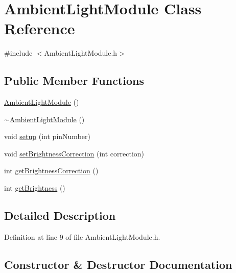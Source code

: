 \hypertarget{class_ambient_light_module}{}\section{Ambient\+Light\+Module Class Reference}
\label{class_ambient_light_module}


{\ttfamily \#include $<$Ambient\+Light\+Module.\+h$>$}

\subsection*{Public Member Functions}
\begin{DoxyCompactItemize}
\item 
\mbox{\hyperlink{class_ambient_light_module_af809a11bd02237709840e18639108b00}{Ambient\+Light\+Module}} ()
\item 
\mbox{\hyperlink{class_ambient_light_module_a752ef750506c28a2afa34d64450bec05}{$\sim$\+Ambient\+Light\+Module}} ()
\item 
void \mbox{\hyperlink{class_ambient_light_module_a81e6f755ce07dfabe34bcb7ef61fcf41}{setup}} (int pin\+Number)
\item 
void \mbox{\hyperlink{class_ambient_light_module_a1a8cce98e966888ab2f1b177835b3efe}{set\+Brightness\+Correction}} (int correction)
\item 
int \mbox{\hyperlink{class_ambient_light_module_ac2b96b6eddd0b246b2b34218c282b370}{get\+Brightness\+Correction}} ()
\item 
int \mbox{\hyperlink{class_ambient_light_module_ab6044dd9f3901cb45e01ae4dc0f337d8}{get\+Brightness}} ()
\end{DoxyCompactItemize}


\subsection{Detailed Description}


Definition at line 9 of file Ambient\+Light\+Module.\+h.



\subsection{Constructor \& Destructor Documentation}
\mbox{\label{class_ambient_light_module_af809a11bd02237709840e18639108b00}} 
